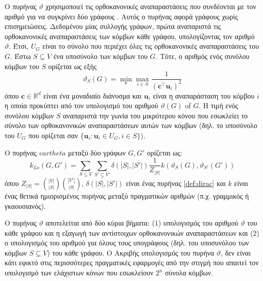 Ο πυρήνας  $\vartheta$ χρησιμοποιεί τις ορθοκανονικές αναπαραστάσεις που συνδέονται με τον αριθμό  για να συγκρίνει δύο γράφους \cite{johansson2014global}.
Αυτός ο πυρήνας αφορά γράφους χωρίς επισημειώσεις.
Δεδομένου μίας συλλογής γράφων, πρώτα αναπαριστά τις ορθοκανονικές αναπαραστάσεις των κόμβων κάθε γράφου, υπολογίζοντας τον αριθμό  $\vartheta$.
Έτσι, $U_G$ είναι το σύνολο που περιέχει όλες τις ορθοκανονικές αναπαραστάσεις του $G$.
Έστω $S \subseteq V$ ένα υποσύνολο των κόμβων του $G$.
Τότε, ο αριθμός  ενός συνόλου κόμβων του $S$ ορίζεται ως εξής
\begin{equation}
    \vartheta_S(G) = \min_{\mathbf{c}} \max_{i \in S} \frac{1}{(\mathbf{c}^\top \mathbf{u}_i)^2}
\end{equation}
όπου $\mathbf{c} \in \mathbb{R}^d$ είναι ένα μοναδιαίο διάνυσμα και $\mathbf{u}_i$ είναι η αναπαράσταση του κόμβου $i$ η οποία προκύπτει από τον υπολογισμό του αριθμού  $\vartheta(G)$ of $G$.
Η τιμή  ενός συνόλου κόμβων $S$ αναπαριστά την γωνία του μικρότερου κόνου που εσωκλείει το σύνολο των ορθοκανονικών αναπαραστάσεων αυτών των κόμβων (δηλ. το υποσύνολο του $U_G$ που ορίζεται σαν $\{ \mathbf{u}_i : \mathbf{u}_i \in U_G, i \in S \}$).

Ο πυρήνας  $vartheta$ μεταξύ δύο γράφων $G, G'$ ορίζεται ως:
\begin{equation}
    k_{Lo}(G, G') = \sum_{S \subseteq V} \sum_{S' \subseteq V'} \delta(|S|, |S'|) \frac{1}{Z_{|S|}} k(\vartheta_S(G), \vartheta_{S'}(G'))
\end{equation}
όπου $Z_{|S|} = \binom{|V|}{|S|} \binom{|V'|}{|S|}$, $\delta(|S|, |S'|)$ είναι ένας πυρήνας  \ref{def:dirac} και $k$ είναι ένας θετικά ημιορισμένος πυρήνας μεταξύ πραγματικών αριθμών (π.χ. γραμμικός ή γκαουσιανός).

Ο πυρήνας  $\vartheta$ αποτελείται από δύο κύρια βήματα: ($1$) υπολογισμός του αριθμού  $\vartheta$ του κάθε γράφου και η εξαγωγή των αντίστοιχων ορθοκανονικών αναπαραστάσεων και ($2$) ο υπολογισμός του αριθμού  για όλους τους υπογράφους (δηλ. του υποσυνόλου των κόμβων $S \subseteq V$) του κάθε γράφου.
Ο Ακριβής υπολογισμός του πυρήνα  $\vartheta$, δεν είναι κάτι εφικτό στις περισσότερες πραγματικές εφαρμογές από την στιγμή που απαιτεί τον υπολογισμό των ελάχιστων κόνων που εσωκλείουν $2^n$ σύνολα κόμβων.

